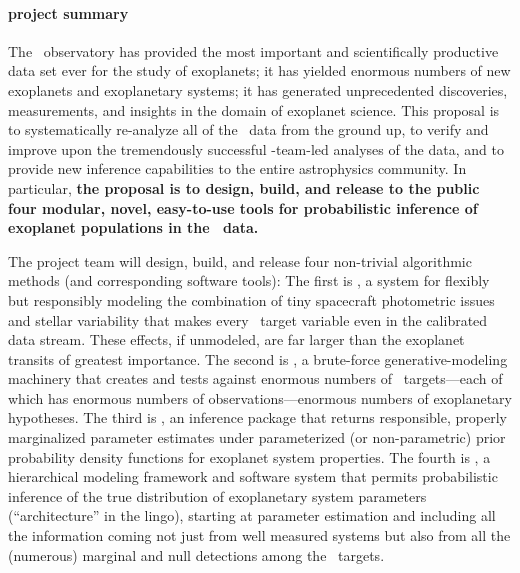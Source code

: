 \documentclass[letterpaper,12pt]{article}
\newcommand{\Untrendy}{\package{Untrendy}}
\newcommand{\Turnstyle}{\package{IronHorse}}
\newcommand{\Bart}{\package{Bart}}
\newcommand{\TheCreator}{\package{TheCreator}}
\begin{document}
\paragraph{project summary}

The \Kepler\ observatory has provided the most important and
scientifically productive data set ever for the study of exoplanets;
it has yielded enormous numbers of new exoplanets and exoplanetary
systems; it has generated unprecedented discoveries, measurements, and
insights in the domain of exoplanet science.  This proposal is to
systematically re-analyze all of the \Kepler\ data from the ground up,
to verify and improve upon the tremendously successful
\Kepler-team-led analyses of the data, and to provide new inference
capabilities to the entire astrophysics community.  In particular,
\textbf{the proposal is to design, build, and release to the public
  four modular, novel, easy-to-use tools for probabilistic inference
  of exoplanet populations in the \Kepler\ data.}

The project team will design, build, and release four non-trivial
algorithmic methods (and corresponding software tools): The first is
\Untrendy, a system for flexibly but responsibly modeling the
combination of tiny spacecraft photometric issues and stellar
variability that makes every \Kepler\ target variable even in the
calibrated data stream.  These effects, if unmodeled, are far larger
than the exoplanet transits of greatest importance.  The second is
\Turnstyle, a brute-force generative-modeling machinery that creates
and tests against enormous numbers of \Kepler\ targets---each of which
has enormous numbers of observations---enormous numbers of
exoplanetary hypotheses.  The third is \Bart, an inference package
that returns responsible, properly marginalized parameter estimates
under parameterized (or non-parametric) prior probability density
functions for exoplanet system properties.  The fourth is \TheCreator,
a hierarchical modeling framework and software system that permits
probabilistic inference of the true distribution of exoplanetary
system parameters (``architecture'' in the lingo), starting at
parameter estimation and including all the information coming not just
from well measured systems but also from all the (numerous) marginal
and null detections among the \Kepler\ targets.
\end{document}
